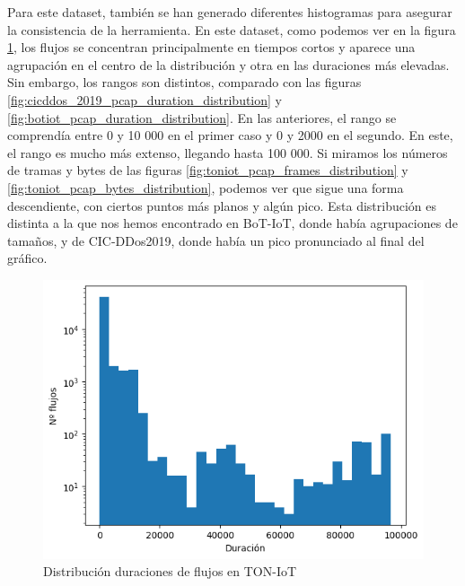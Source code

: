
Para este dataset, también se han generado diferentes histogramas para asegurar la consistencia de la herramienta. En este dataset, como podemos ver en la figura \ref{fig:toniot_pcap_duration_distribution}, los flujos se concentran principalmente en tiempos cortos y aparece una agrupación en el centro de la distribución y otra en las duraciones más elevadas. Sin embargo, los rangos son distintos, comparado con las figuras \ref{fig:cicddos_2019_pcap_duration_distribution} y \ref{fig:botiot_pcap_duration_distribution}. En las anteriores, el rango se comprendía entre 0 y 10 000 en el primer caso y 0 y 2000 en el segundo. En este, el rango es mucho más extenso, llegando hasta 100 000. Si miramos los números de tramas y bytes de las figuras \ref{fig:toniot_pcap_frames_distribution} y \ref{fig:toniot_pcap_bytes_distribution}, podemos ver que sigue una forma descendiente, con ciertos puntos más planos y algún pico. Esta distribución es distinta a la que nos hemos encontrado en BoT-IoT, donde había agrupaciones de tamaños, y de CIC-DDos2019, donde había un pico pronunciado al final del gráfico.

\begin{figure}[H]
  \begin{center}
      \includegraphics[width=0.49\linewidth]{media/toniot_pcap_duration_distribution.png}
  \end{center}
  \captionsetup{justification=centering}
  \caption{Distribución duraciones de flujos en TON-IoT}\label{fig:toniot_pcap_duration_distribution}
\end{figure}

